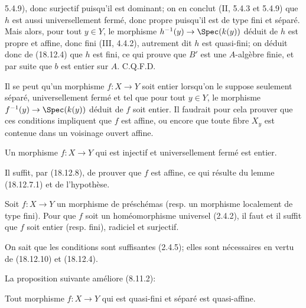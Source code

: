
5.4.9), donc surjectif puisqu'il est dominant; on en conclut (II, 5.4.3 et 5.4.9) que $h$ est aussi universellement fermé, donc propre puisqu'il est de type fini et séparé. Mais alors, pour tout $y\in Y$, le morphisme $h^{-1}(y)\to\Spec(k(y))$ déduit de $h$ est propre et affine, donc fini (III, 4.4.2), autrement dit $h$ est quasi-fini; on déduit donc de (18.12.4) que $h$ est fini, ce qui prouve que $B'$ est une $A$-algèbre finie, et par suite que $b$ est entier sur $A$. C.Q.F.D.

\begin{remark}[18.12.9]
\label{IV.18.12.9}
Il se peut qu'un morphisme $f:X\to Y$ soit entier lorsqu'on le suppose seulement séparé, universellement fermé et tel que pour tout $y\in Y$, le morphisme $f^{-1}(y)\to\Spec(k(y))$ déduit de $f$ soit entier. Il faudrait pour cela prouver que ces conditions impliquent que $f$ est affine, ou encore que toute fibre $X_y$ est contenue dans un voisinage ouvert affine.
\end{remark}

\begin{corollary}[18.12.10]
\label{IV.18.12.10}
Un morphisme $f:X\to Y$ qui est injectif et universellement fermé est entier.
\end{corollary}

Il suffit, par (18.12.8), de prouver que $f$ est affine, ce qui résulte du lemme (18.12.7.1) et de l'hypothèse.

\begin{corollary}[18.12.11]
\label{IV.18.12.11}
Soit $f:X\to Y$ un morphisme de préschémas (resp. un morphisme localement de type fini). Pour que $f$ soit un homéomorphisme universel (2.4.2), il faut et il suffit que $f$ soit entier (resp. fini), radiciel et surjectif.
\end{corollary}

On sait que les conditions sont suffisantes (2.4.5); elles sont nécessaires en vertu de (18.12.10) et (18.12.4).

La proposition suivante améliore (8.11.2):

\begin{proposition}[18.12.12]
\label{IV.18.12.12}
Tout morphisme $f:X\to Y$ qui est quasi-fini et séparé est quasi-affine.
\end{proposition}

